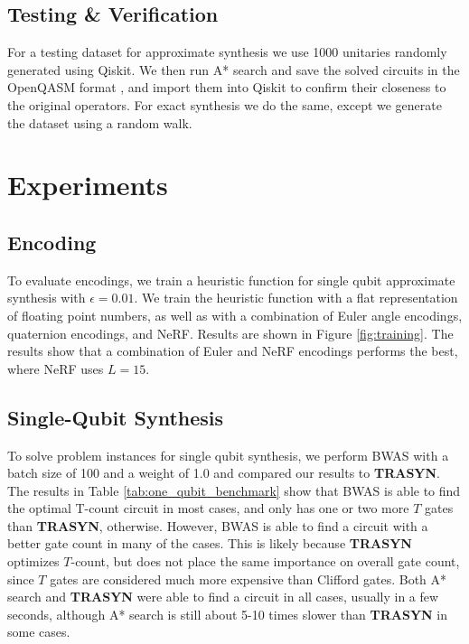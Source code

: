 \documentclass[letterpaper]{article} %
\begin{document}
\subsection{Testing \& Verification}


For a testing dataset for approximate synthesis we use 1000 unitaries randomly generated using Qiskit.
We then run A* search and save the solved circuits in the OpenQASM format \cite{cross2022openqasm},
and import them into Qiskit to confirm their closeness to the original operators.
For exact synthesis we do the same, except we generate the dataset using a random walk.



\section{Experiments}

\subsection{Encoding}
To evaluate encodings, we train a heuristic function for single qubit approximate synthesis with $\epsilon=0.01$. We train the heuristic function with a flat representation of floating point numbers, as well as with a combination of Euler angle encodings, quaternion encodings, and NeRF. Results are shown in Figure \ref{fig:training}. The results show that a combination of Euler and NeRF encodings performs the best, where NeRF uses $L=15$.

\subsection{Single-Qubit Synthesis}

To solve problem instances for single qubit synthesis, we perform BWAS with a batch size of 100 and a weight of 1.0 and compared our results to \textbf{TRASYN}.
The results in Table \ref{tab:one_qubit_benchmark} show that BWAS is able to find the optimal T-count circuit in most cases, and only has one or two more $T$ gates than \textbf{TRASYN}, otherwise.
However, BWAS is able to find a circuit with a better gate count in many of the cases.
This is likely because \textbf{TRASYN} optimizes $T$-count, but does not place the same importance on overall gate count, since $T$ gates are considered much more expensive than Clifford gates.
Both A* search and \textbf{TRASYN} were able to find a circuit in all cases, usually in a few seconds, although A* search is still about 5-10 times slower than \textbf{TRASYN} in some cases.
\end{document}
